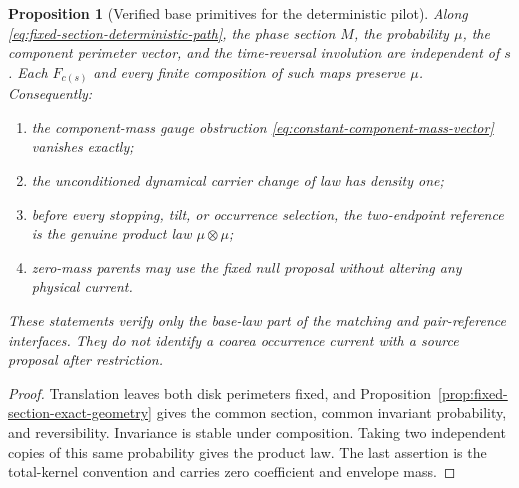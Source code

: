\documentclass[11pt]{article}
\newtheorem{proposition}[theorem]{Proposition}
\begin{document}
\begin{proposition}[Verified base primitives for the deterministic pilot]
\label{prop:fixed-section-verified-primitives}
Along \eqref{eq:fixed-section-deterministic-path}, the phase section $M$,
the probability $\mu$, the component perimeter vector, and the time-reversal
involution are independent of $s$.  Each $F_{c(s)}$ and every finite
composition of such maps preserve $\mu$.  Consequently:
\begin{enumerate}[label=\textup{(V\arabic*)}]
\item the component-mass gauge obstruction
      \eqref{eq:constant-component-mass-vector} vanishes exactly;
\item the unconditioned dynamical carrier change of law has density one;
\item before every stopping, tilt, or occurrence selection, the two-endpoint
      reference is the genuine product law $\mu\otimes\mu$;
\item zero-mass parents may use the fixed null proposal without altering any
      physical current.
\end{enumerate}
These statements verify only the base-law part of the matching and
pair-reference interfaces.  They do not identify a coarea occurrence current
with a source proposal after restriction.
\end{proposition}

\begin{proof}
Translation leaves both disk perimeters fixed, and
Proposition~\ref{prop:fixed-section-exact-geometry} gives the common section,
common invariant probability, and reversibility.  Invariance is stable under
composition.  Taking two independent copies of this same probability gives
the product law.  The last assertion is the total-kernel convention and
carries zero coefficient and envelope mass.
\end{proof}
\end{document}
